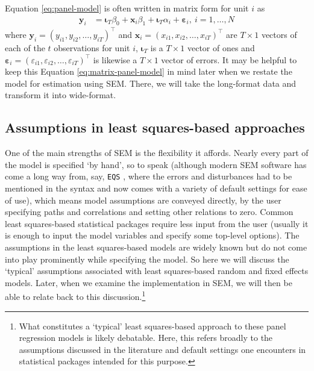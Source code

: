 \documentclass[]{interact}
\theoremstyle{plain}%
\theoremstyle{definition}
\theoremstyle{remark}
\begin{document}
Equation \eqref{eq:panel-model} is often written in matrix form for unit
\(i\) as \begin{align}
\bm{y}_{i} & = \bm{\iota}_{T}\beta_{0} + \bm{x}_{i}\beta_{1} + \bm{\iota}_{T} \alpha_{i} + \bm{\varepsilon}_{i}, \ i = 1, \ldots, N \label{eq:matrix-panel-model}
\end{align} where
\(\bm{y}_{i} = (y_{i1}, y_{i2}, \ldots, y_{iT})^{\intercal}\) and
\(\bm{x}_{i} = (x_{i1}, x_{i2}, \ldots, x_{iT})^{\intercal}\) are
\(T \times 1\) vectors of each of the \(t\) observations for unit \(i\),
\(\bm{\iota}_{T}\) is a \(T \times 1\) vector of ones and
\(\bm{\varepsilon}_{i} = (\varepsilon_{i1}, \varepsilon_{i2}, \ldots, \varepsilon_{iT})^{\intercal}\)
is likewise a \(T \times 1\) vector of errors. It may be helpful to keep
this Equation \eqref{eq:matrix-panel-model} in mind later when we
restate the model for estimation using SEM. There, we will take the
long-format data and transform it into wide-format.

\hypertarget{assumptions-in-least-squares-based-approaches}{%
\subsection{Assumptions in least squares-based
approaches}\label{assumptions-in-least-squares-based-approaches}}

One of the main strengths of SEM is the flexibility it affords. Nearly
every part of the model is specified `by hand', so to speak (although
modern SEM software has come a long way from, say, \texttt{EQS}
\citep{Bentler2006}, where the errors and disturbances had to be
mentioned in the syntax and now comes with a variety of default settings
for ease of use), which means model assumptions are conveyed directly,
by the user specifying paths and correlations and setting other
relations to zero. Common least squares-based statistical packages
\citep[like the \texttt{plm} package in \texttt{R},][]{R-plm_a} require
less input from the user (usually it is enough to input the model
variables and specify some top-level options). The assumptions in the
least squares-based models are widely known
\citep{Wooldridge2012, Bruederl2015, Greene2012, Angrist2009} but do not
come into play prominently while specifying the model. So here we will
discuss the `typical' assumptions associated with least squares-based
random and fixed effects models. Later, when we examine the
implementation in SEM, we will then be able to relate back to this
discussion.\footnote{What constitutes a `typical' least squares-based
  approach to these panel regression models is likely debatable. Here,
  this refers broadly to the assumptions discussed in the literature and
  default settings one encounters in statistical packages intended for
  this purpose.}
\end{document}
